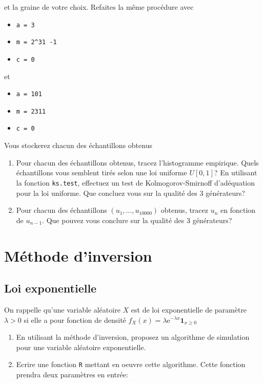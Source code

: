 \documentclass[]{article}
\providecommand{\tightlist}{%
  \setlength{\itemsep}{0pt}\setlength{\parskip}{0pt}}
\begin{document}
et la graine de votre choix. Refaites la même procédure avec

\begin{itemize}
\tightlist
\item
  \texttt{a\ =\ 3}
\item
  \texttt{m\ =\ 2\^{}31\ -1}
\item
  \texttt{c\ =\ 0}
\end{itemize}

et

\begin{itemize}
\tightlist
\item
  \texttt{a\ =\ 101}
\item
  \texttt{m\ =\ 2311}
\item
  \texttt{c\ =\ 0}
\end{itemize}

Vous stockerez chacun des échantillons obtenus

\begin{enumerate}
\def\labelenumi{\arabic{enumi}.}
\setcounter{enumi}{2}
\item
  Pour chacun des échantillons obtenus, tracez l'histogramme empirique.
  Quels échantillons vous semblent tirés selon une loi uniforme
  \(U[0, 1]\)? En utilisant la fonction \texttt{ks.test}, effectuez un
  test de Kolmogorov-Smirnoff d'adéquation pour la loi uniforme. Que
  concluez vous sur la qualité des 3 générateurs?
\item
  Pour chacun des échantillons \((u_1,\dots, u_{10000})\) obtenus,
  tracez \(u_n\) en fonction de \(u_{n-1}\). Que pouvez vous conclure
  sur la qualité des 3 générateurs?
\end{enumerate}

\hypertarget{muxe9thode-dinversion}{%
\section{Méthode d'inversion}\label{muxe9thode-dinversion}}

\hypertarget{loi-exponentielle}{%
\subsection{Loi exponentielle}\label{loi-exponentielle}}

On rappelle qu'une variable aléatoire \(X\) est de loi exponentielle de
paramètre \(\lambda > 0\) si elle a pour fonction de densité
\(f_X(x) = \lambda\text{e}^{-\lambda x} \mathbf{1}_{x\geq0}\)

\begin{enumerate}
\def\labelenumi{\arabic{enumi}.}
\item
  En utilisant la méthode d'inversion, proposez un algorithme de
  simulation pour une variable aléatoire exponentielle.
\item
  Ecrire une fonction \texttt{R} mettant en oeuvre cette algorithme.
  Cette fonction prendra deux paramètres en entrée:
\end{enumerate}
\end{document}
